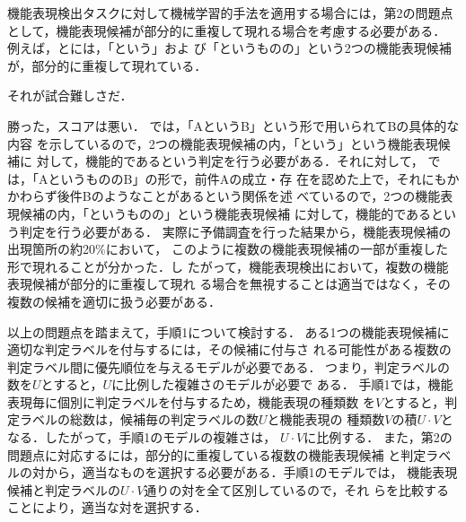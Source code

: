 \documentclass[japanese]{jnlp_1.2d}
\newcommand{\uline}[1]{}
\newcounter{example}
\newenvironment{example}{}{}
\newcommand{\strref}[1]{}
\begin{document}
機能表現検出タスクに対して機械学習的手法を適用する場合には，第2の問題点
として，機能表現候補が部分的に重複して現れる場合を考慮する必要がある．
例えば，\strref{ex:toiu-F}と\strref{ex:toiumonono-F}には，「という」およ
び「というものの」という2つの機能表現候補が，部分的に重複して現れている．
\begin{example}
  \item それが試合\kern0pt\uline{\uline{という}{\kern0pt}ものの}{\kern0pt}難しさだ．
	\label{ex:toiu-F}
  \item 勝った{\kern0pt}\uline{\uline{という}}\uline{ものの}，スコアは悪い．
	\label{ex:toiumonono-F}
\end{example}
\strref{ex:toiu-F}では，「AというB」という形で用いられてBの具体的な内容
を示しているので，2つの機能表現候補の内，「という」という機能表現候補に
対して，機能的であるという判定を行う必要がある．それに対して，
\strref{ex:toiumonono-F}では，「AというもののB」の形で，前件Aの成立・存
在を認めた上で，それにもかかわらず後件Bのようなことがあるという関係を述
べているので，2つの機能表現候補の内，「というものの」という機能表現候補
に対して，機能的であるという判定を行う必要がある．
実際に予備調査を行った結果から，機能表現候補の出現箇所の約20\%において，
このように複数の機能表現候補の一部が重複した形で現れることが分かった．し
たがって，機能表現検出において，複数の機能表現候補が部分的に重複して現れ
る場合を無視することは適当ではなく，その複数の候補を適切に扱う必要がある．


以上の問題点を踏まえて，手順1について検討する．
ある1つの機能表現候補に適切な判定ラベルを付与するには，その候補に付与さ
れる可能性がある複数の判定ラベル間に優先順位を与えるモデルが必要である．
つまり，判定ラベルの数を$U$とすると，$U$に比例した複雑さのモデルが必要で
ある．
手順1では，機能表現毎に個別に判定ラベルを付与するため，機能表現の種類数
を$V$とすると，判定ラベルの総数は，候補毎の判定ラベルの数$U$と機能表現の
種類数$V$の積$U\cdot V$となる．したがって，手順1のモデルの複雑さは，
$U\cdot V$に比例する．
また，第2の問題点に対応するには，部分的に重複している複数の機能表現候補
と判定ラベルの対から，適当なものを選択する必要がある．手順1のモデルでは，
機能表現候補と判定ラベルの$U\cdot V$通りの対を全て区別しているので，それ
らを比較することにより，適当な対を選択する．
\end{document}
